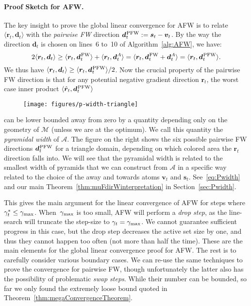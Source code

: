 \documentclass{article} %
\newcommand{\domain}{\mathcal{M}} %
\newcommand{\stepsize}{\gamma}
\newcommand{\stepmax}{\stepsize_{\textnormal{\scriptsize max}}} %
\newcommand{\FW}{{\hspace{0.05em}\textnormal{FW}}}
\newcommand{\PFW}{{\hspace{0.05em}\textnormal{PFW}}}
\newcommand{\s}{\bm{s}}
\newcommand{\dd}{\bm{d}}
\newcommand{\vv}{\bm{v}} %
\newcommand{\Vertices}{\mathcal{A}} %
\renewcommand{\r}{\bm{r}}
\newcommand{\innerProdCompressed}[2]{\langle #1 , #2 \rangle}
\newcommand{\0}{\mathbf{0}} %
\begin{document}
\paragraph{Proof Sketch for AFW.} The key insight to prove the global linear
convergence for AFW is to relate $\innerProdCompressed{\r_t}{\dd_t}$ with the
\emph{pairwise FW} direction $\dd_t^\PFW := \s_t - \vv_t$. By the way the
direction $\dd_t$ is chosen on lines~6 to~10 of Algorithm~\ref{alg:AFW}, we have:
\begin{equation} \label{eq:AFWgapInequality}
2 \innerProdCompressed{\r_t}{\dd_t} \geq
\innerProdCompressed{\r_t}{\dd_t^\FW} + \innerProdCompressed{\r_t}{\dd_t^A} =
\innerProdCompressed{\r_t}{\dd_t^\FW+\dd_t^A} = 
\innerProdCompressed{\r_t}{\dd_t^\PFW} .  
\end{equation}
We thus have $\innerProdCompressed{\r_t}{\dd_t} \geq
\innerProdCompressed{\r_t}{\dd_t^\PFW} / 2$. Now the crucial property of the
pairwise FW direction is that for any potential negative gradient direction
$\r_t$, the worst case inner product $\innerProdCompressed{\hat{\r}_t}{\dd_t^\PFW}$
\begin{wrapfigure}{r}{3.5cm}\vspace{-3mm}\hspace{-3mm}
%
\texttt{[image: figures/p-width-triangle]}\vspace{-0.5em}
\label{fig:pwidth}
%
\vspace{-1.5em}
\end{wrapfigure}
%
%
%
can be lower bounded away from
zero by a quantity depending only on the geometry of $\domain$ (unless we are at the optimum).
We call this quantity the \emph{pyramidal width} of $\Vertices$. 
The figure on the right shows the six possible pairwise FW directions $\dd_t^\PFW$ for a triangle domain, depending on which colored area the $\r_t$ direction falls into. We will see that the pyramidal width is
related to the smallest width of pyramids that we can construct from
$\Vertices$ in a specific way related to the choice of the away and towards atoms $\vv_t$ and $\s_t$. See~\eqref{eq:Pwidth} and our main Theorem~\ref{thm:muFdirWinterpretation} in Section~\ref{sec:Pwidth}.

This gives the main argument for the linear convergence of AFW for steps
where $\gamma_t^* \leq \stepmax$. When~$\stepmax$ is too small, AFW will perform a
\emph{drop step}, as the line-search will truncate the step-size to
$\stepsize_t = \stepmax$. We cannot guarantee sufficient progress in this
case, but the drop step decreases the active set size by one, and thus they
cannot happen too often (not more than half the time). These are the main
elements for the global linear convergence proof for AFW. The rest is to
carefully consider various boundary cases.
We can re-use the same 
techniques to prove the convergence for pairwise FW, though unfortunately the
latter also has the possibility of problematic \emph{swap steps}. While their
number can be bounded, so far we only found the extremely loose bound quoted in Theorem~\ref{thm:megaConvergenceTheorem}.\vspace{-2mm}
\end{document}
